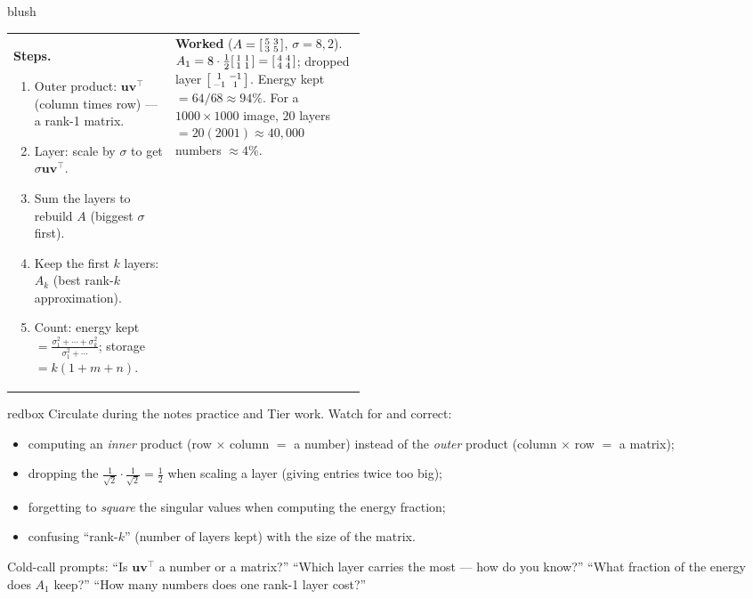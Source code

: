 \documentclass[10pt]{article}
\newcommand{\uu}{\mathbf{u}}
\newcommand{\vv}{\mathbf{v}}
\newcommand{\T}{^{\top}}
\begin{document}
\begin{skillbox}{blush}
\begin{tabularx}{\linewidth}{@{}p{0.46\linewidth} X@{}}
\textbf{Steps.}
\begin{enumerate}[leftmargin=1.3em, nosep, after=\vspace{2pt}]
  \item Outer product: $\uu\vv\T$ (column times row) --- a rank-1 matrix.
  \item Layer: scale by $\sigma$ to get $\sigma\uu\vv\T$.
  \item Sum the layers to rebuild $A$ (biggest $\sigma$ first).
  \item Keep the first $k$ layers: $A_k$ (best rank-$k$ approximation).
  \item Count: energy kept $=\tfrac{\sigma_1^2+\cdots+\sigma_k^2}{\sigma_1^2+\cdots}$; storage $=k(1+m+n)$.
\end{enumerate}
&
\textbf{Worked} ($A=\begin{bsmallmatrix} 5 & 3\\ 3 & 5 \end{bsmallmatrix}$, $\sigma=8,2$).
$A_1=8\cdot\tfrac12\begin{bsmallmatrix} 1 & 1\\ 1 & 1 \end{bsmallmatrix}=\begin{bsmallmatrix} 4 & 4\\ 4 & 4 \end{bsmallmatrix}$;
dropped layer $\begin{bsmallmatrix} 1 & -1\\ -1 & 1 \end{bsmallmatrix}$.
Energy kept $=64/68\approx94\%$. For a $1000\times1000$ image, $20$ layers $=20(2001)\approx40{,}000$
numbers $\approx4\%$.
\end{tabularx}
\end{skillbox}

\begin{skillbox}{redbox}
Circulate during the notes practice and Tier work. Watch for and correct:
\begin{itemize}[leftmargin=1.2em, nosep]
  \item computing an \emph{inner} product (row $\times$ column $=$ a number) instead of the \emph{outer} product (column $\times$ row $=$ a matrix);
  \item dropping the $\tfrac1{\sqrt2}\cdot\tfrac1{\sqrt2}=\tfrac12$ when scaling a layer (giving entries twice too big);
  \item forgetting to \emph{square} the singular values when computing the energy fraction;
  \item confusing ``rank-$k$'' (number of layers kept) with the size of the matrix.
\end{itemize}
Cold-call prompts: ``Is $\uu\vv\T$ a number or a matrix?'' ``Which layer carries the most --- how do you know?''
``What fraction of the energy does $A_1$ keep?'' ``How many numbers does one rank-1 layer cost?''
\end{skillbox}
\end{document}
